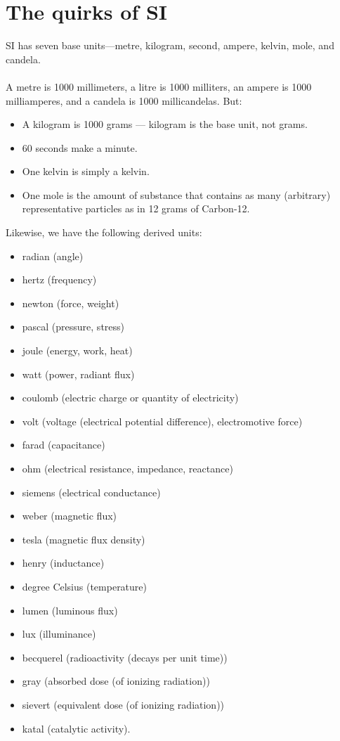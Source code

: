 \section*{The quirks of SI}
SI has seven base units—metre, kilogram, second, ampere, kelvin, mole, and candela.
\\~\\
A metre is 1000 millimeters, a litre is 1000 milliters, an ampere is 1000 milliamperes, and a candela is 1000 millicandelas. But:
\begin{itemize}
  \item A kilogram is 1000 grams --- kilogram is the base unit, not grams.
  \item 60 seconds make a minute.
  \item One kelvin is simply a kelvin.
  \item One mole is the amount of substance that contains as many (arbitrary) representative particles as in 12 grams of Carbon-12.
\end{itemize}
Likewise, we have the following derived units:
\begin{itemize}
  \item radian (angle)
  \item hertz (frequency)
  \item newton (force, weight)
  \item pascal (pressure, stress)
  \item joule (energy, work, heat)
  \item watt (power, radiant flux)
  \item coulomb (electric charge or quantity of electricity)
  \item volt (voltage  (electrical potential difference), electromotive force)
  \item farad (capacitance)
  \item ohm (electrical resistance, impedance, reactance)
  \item siemens (electrical conductance)
  \item weber (magnetic flux)
  \item tesla (magnetic flux density)
  \item henry (inductance)
  \item degree Celsius    (temperature)
  \item lumen (luminous flux)
  \item lux (illuminance)
  \item becquerel (radioactivity  (decays per unit time))
  \item gray (absorbed dose  (of ionizing radiation))
  \item sievert (equivalent dose  (of ionizing radiation))
  \item katal (catalytic activity).
\end{itemize}

